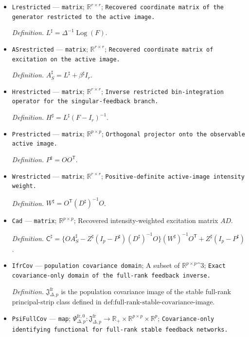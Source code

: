 \documentclass{article}
\begin{document}
\begin{itemize}
  \item \texttt{Lrestricted} --- \texttt{matrix}; \(\mathbb R^{r\times r}\); \texttt{Recovered coordinate matrix of the generator restricted to the active image.}
  \par\smallskip\noindent\emph{Definition.} \(L^\sharp=\Delta^{-1}\operatorname{Log}(F)\).
  \item \texttt{ASrestricted} --- \texttt{matrix}; \(\mathbb R^{r\times r}\); \texttt{Recovered coordinate matrix of excitation on the active image.}
  \par\smallskip\noindent\emph{Definition.} \(A_S^\sharp=L^\sharp+\beta^\sharp I_r\).
  \item \texttt{Hrestricted} --- \texttt{matrix}; \(\mathbb R^{r\times r}\); \texttt{Inverse restricted bin-\allowbreak{}integration operator for the singular-\allowbreak{}feedback branch.}
  \par\smallskip\noindent\emph{Definition.} \(H^\sharp=L^\sharp(F-I_r)^{-1}\).
  \item \texttt{Prestricted} --- \texttt{matrix}; \(\mathbb R^{p\times p}\); \texttt{Orthogonal projector onto the observable active image.}
  \par\smallskip\noindent\emph{Definition.} \(P^\sharp=OO^{\mathsf T}\).
  \item \texttt{Wrestricted} --- \texttt{matrix}; \(\mathbb R^{r\times r}\); \texttt{Positive-\allowbreak{}definite active-\allowbreak{}image intensity weight.}
  \par\smallskip\noindent\emph{Definition.} \(W^\sharp=O^{\mathsf T}(D^\sharp)^{-1}O\).
  \item \texttt{Cad} --- \texttt{matrix}; \(\mathbb R^{p\times p}\); Recovered intensity-weighted excitation matrix \(AD\).
  \par\smallskip\noindent\emph{Definition.} \(\mathsf C^\sharp=\{OA_S^\sharp-Z^\sharp(I_p-P^\sharp)(D^\sharp)^{-1}O\}(W^\sharp)^{-1}O^{\mathsf T}+Z^\sharp(I_p-P^\sharp)\).
  \item \texttt{IfrCov} --- \texttt{population covariance domain}; A subset of \(\mathbb R^{p\times p}\)\textasciicircum{}3; \texttt{Exact covariance-\allowbreak{}only domain of the full-\allowbreak{}rank feedback inverse.}
  \par\smallskip\noindent\emph{Definition.} \(\mathfrak J_{\Delta,p}^{\mathrm{fr}}\) is the population covariance image of the stable full-rank principal-strip class defined in \(\text{def:full-rank-stable-covariance-image}\).
  \item \texttt{PsiFullCov} --- \texttt{map}; \(\Psi_{\Delta,p}^{\mathrm{fr},0}:\mathfrak J_{\Delta,p}^{\mathrm{fr}}\to\mathbb R_+\times\mathbb R^{p\times p}\times\mathbb R^p\); \texttt{Covariance-\allowbreak{}only identifying functional for full-\allowbreak{}rank stable feedback networks.}

\end{itemize}
\end{document}

